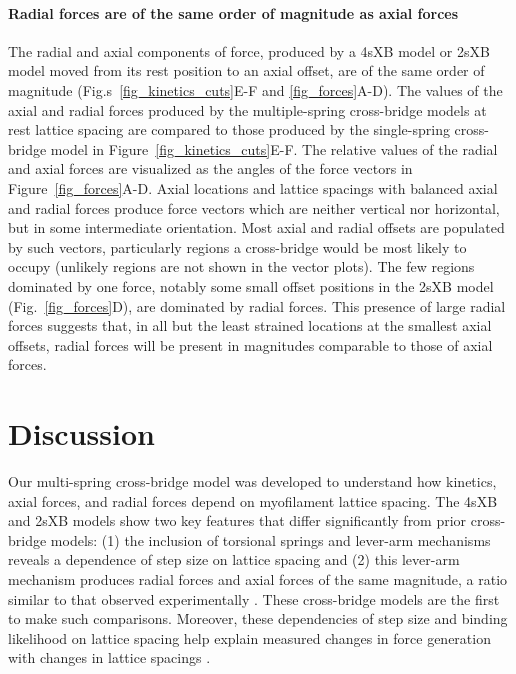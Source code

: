 \documentclass[10pt]{article}
\newcommand{\citep}[1]{\cite{#1}} %
\begin{document}
\paragraph{Radial forces are of the same order of magnitude as axial forces} %
The radial and axial components of force, produced by a 4sXB model or 2sXB model moved from its rest position to an axial offset, are of the same order of magnitude (Fig.s~\ref{fig_kinetics_cuts}E-F and \ref{fig_forces}A-D). 
The values of the axial and radial forces produced by the multiple-spring cross-bridge models at rest lattice spacing are compared to those produced by the single-spring cross-bridge model in Figure~\ref{fig_kinetics_cuts}E-F.
The relative values of the radial and axial forces are visualized as the angles of the force vectors in Figure~\ref{fig_forces}A-D. 
Axial locations and lattice spacings with balanced axial and radial forces produce force vectors which are neither vertical nor horizontal, but in some intermediate orientation.
Most axial and radial offsets are populated by such vectors, particularly regions a cross-bridge would be most likely to occupy (unlikely regions are not shown in the vector plots). 
The few regions dominated by one force, notably some small offset positions in the 2sXB model (Fig.~\ref{fig_forces}D), are dominated by radial forces.
This presence of large radial forces suggests that, in all but the least strained locations at the smallest axial offsets, radial forces will be present in magnitudes comparable to those of axial forces. 



\section*{Discussion} %

Our multi-spring cross-bridge model was developed to understand how kinetics, axial forces, and radial forces depend on myofilament lattice spacing.
The 4sXB and 2sXB models show two key features that differ significantly from prior cross-bridge models: (1) the inclusion of torsional springs and lever-arm mechanisms reveals a dependence of step size on lattice spacing and (2) this lever-arm mechanism produces radial forces and axial forces of the same magnitude, a ratio similar to that observed experimentally \citep{Maughan1981, Cecchi1990, Brenner1991}. 
These cross-bridge models are the first to make such comparisons.
Moreover, these dependencies of step size and binding likelihood on lattice spacing help explain measured changes in force generation with changes in lattice spacings  \citep{Millman1998}. 
\end{document}
